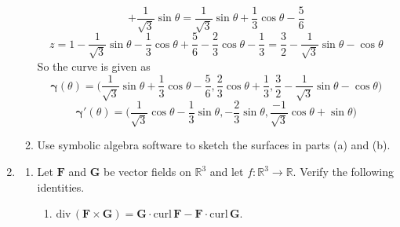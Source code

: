 \documentclass{article}
\newcommand{\divt}{\text{div} \,}
\begin{document}
\begin{enumerate}
\begin{enumerate}
\[                + \frac{1}{\sqrt{3}}\sin \theta = \frac{1}{\sqrt{3}}
                \sin \theta + \frac{1}{3} \cos \theta - \frac{5}{6} \]
            \[z = 1 - \frac{1}{\sqrt{3}} \sin \theta - \frac{1}{3} 
            \cos \theta + \frac{5}{6} - \frac{2}{3} \cos \theta 
            - \frac{1}{3} = \frac{3}{2} - \frac{1}{\sqrt 3 } \sin \theta 
            - \cos \theta \]
            So the curve is given as 
            \[ \boldsymbol \gamma (\theta) = 
            \bigg( \frac{1}{\sqrt{3}} \sin \theta + \frac{1}{3} 
            \cos \theta - \frac{5}{6}, \frac{2}{3}\cos \theta + \frac{1}{3}, 
            \frac{3}{2} - \frac{1}{\sqrt 3 } 
            \sin \theta - \cos \theta \bigg)\]
            \[ \boldsymbol \gamma' (\theta) = 
            \bigg( \frac{1}{\sqrt{3}} \cos \theta - \frac{1}{3} \sin \theta, 
            - \frac{2}{3}\sin \theta , \frac{-1}{\sqrt 3 } \cos \theta 
            + \sin \theta \bigg)\]
            
        \item Use symbolic algebra software to sketch the surfaces 
        in parts (a) and (b).
    \end{enumerate}
    
    \newpage
    \item 
    \begin{enumerate}
        \item Let $\boldsymbol F$ and $\boldsymbol G$ be vector fields on 
        $\mathbb{R}^3$ and let $f : \mathbb{R}^3 \rightarrow \mathbb{R}$.
        Verify the following identities.
        \begin{enumerate}[label=(\roman*)]
            \item $\divt (\boldsymbol F \times \boldsymbol G) 
            = \boldsymbol G \cdot \text{curl} \, \boldsymbol F 
            - \boldsymbol F \cdot \text{curl} \, \boldsymbol G.$


\end{enumerate}
\end{enumerate}
\end{enumerate}
\end{document}
